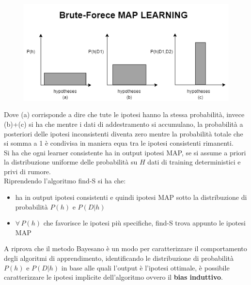 \begin{figure}[H]
    \centering
    \includegraphics[scale = 0.7]{imm/foto_map.png}
\end{figure}
Dove (a) corrisponde a dire che tute le ipotesi hanno la stessa probabilità, invece (b)+(c) si ha che mentre i dati di addestramento si accumulano, la probabilità a posteriori delle ipotesi inconsistenti diventa zero mentre la probabilità totale che si somma a 1 è condivisa in maniera equa tra le ipotesi consistenti rimanenti.\\

Si ha che ogni learner consistente ha in output ipotesi MAP, se si assume a priori la distribuzione uniforme delle probabilità su $H$ dati di training deterministici e privi di rumore.\\

Riprendendo l'algoritmo find-S si ha che: 
\begin{itemize} 
    \item ha in output ipotesi consistenti e quindi ipotesi MAP sotto la distribuzione di probabilità $P(h)$ e $P(D|h)$ 
    \item $\forall\,P(h)$ che favorisce le ipotesi più specifiche, find-S trova appunto le ipotesi MAP 
\end{itemize} 

A riprova che il metodo Bayesano è un modo per caratterizzare il comportamento degli algoritmi di apprendimento, identificando le distribuzione di probabilità $P(h)$ e $P(D|h)$ in base alle quali l'output è l'ipotesi ottimale, è possibile caratterizzare le ipotesi implicite dell'algoritmo ovvero il \textbf{bias induttivo}.\\

